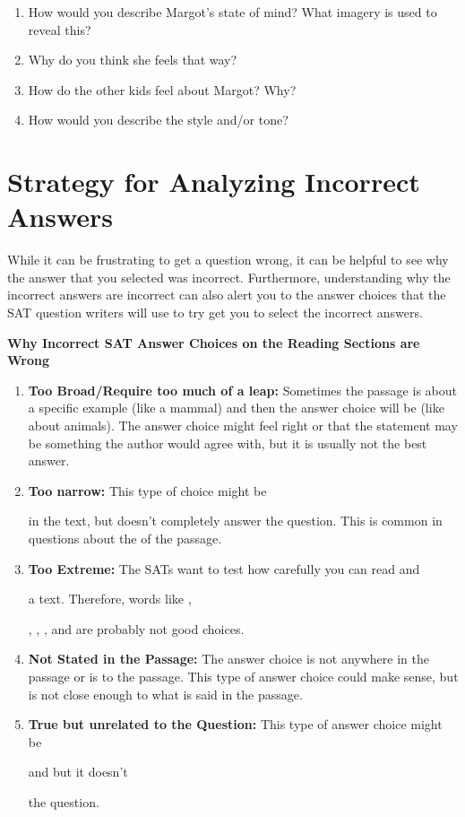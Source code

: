 \begin{enumerate}
\item How would you describe Margot's state of mind?  What imagery is used to reveal this?
\vfill\item Why do you think she feels that way?
\vfill\item How do the other kids feel about Margot?  Why?
\vfill\item How would you describe the style and/or tone?
\end{enumerate}

\vfill
\section[Strategy]{Strategy for Analyzing Incorrect Answers}
While it can be frustrating to get a question wrong, it can be helpful to see why the answer that you selected was incorrect. Furthermore, understanding why the incorrect answers are incorrect can also alert you to the answer choices that the SAT question writers will use to try get you to select the incorrect answers. 

\bigskip
\textbf{Why Incorrect SAT Answer Choices on the Reading Sections are Wrong}

\begin{enumerate}
\item \textbf{Too Broad/Require too much of a leap:} Sometimes the passage is about a specific example (like a mammal) and then the answer choice will be \longline (like about animals). The answer choice might feel right or that the statement may be something the author would agree with, but it is usually not the best answer. 

\item \textbf{Too narrow:} This type of choice might be

\longline in the text, but doesn't completely answer the question. This is common in questions about the \longline of the passage.

\item \textbf{Too Extreme:} The SATs want to test how carefully you can read and

\longline a text. Therefore, words like \longline,

\longline, \longline, \longline, and \longline are probably not good choices. 


\item \textbf{Not Stated in the Passage:} The answer choice is not \longline anywhere in the passage or is \longline to the passage. This type of answer choice could make sense, but is not close enough to what is said in the passage. 

\item \textbf{True but unrelated to the Question:} This type of answer choice might be

\longline and \longline but it doesn't

\longline the question. 
\end{enumerate}

